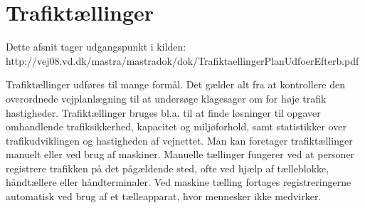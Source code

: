 \section{Trafiktællinger}
\label{sub:trafiktaellinger}
Dette afsnit tager udgangspunkt i kilden:
\\ http://vej08.vd.dk/mastra/mastradok/dok/TrafiktaellingerPlanUdfoerEfterb.pdf

Trafiktællinger udføres til mange formål. Det gælder alt fra at kontrollere den overordnede vejplanlægning til at undersøge klagesager om for høje trafik hastigheder. Trafiktællinger bruges bl.a. til at finde løsninger til opgaver omhandlende trafiksikkerhed, kapacitet og miljøforhold, samt statistikker over trafikudviklingen og hastigheden af vejnettet. Man kan foretager trafiktællinger manuelt eller ved brug af maskiner. 
Manuelle tællinger fungerer ved at personer registrere trafikken på det pågældende sted, ofte ved hjælp af tælleblokke, håndtællere eller håndterminaler. Ved maskine tælling fortages registreringerne automatisk ved brug af et tælleapparat, hvor mennesker ikke medvirker.

